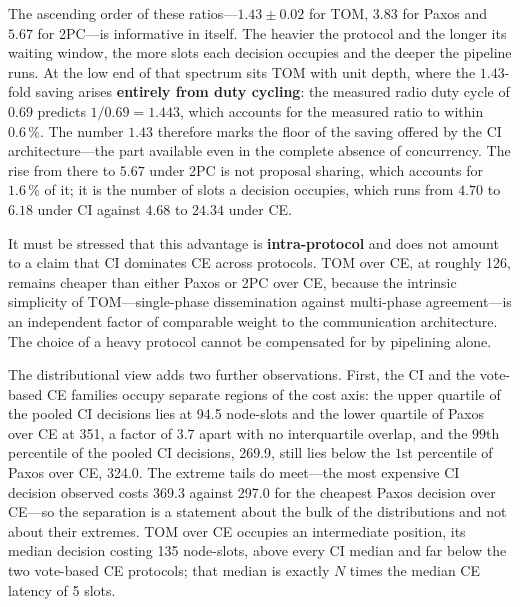 \documentclass[journal]{IEEEtran}
\newcommand{\CI}{CI}                      %
\newcommand{\CE}{CE}                      %
\newcommand{\Nnodes}{N}                   %
\begin{document}
The ascending order of these ratios---$1.43 \pm 0.02$ for TOM, $3.83$ for
Paxos and $5.67$ for 2PC---is informative in itself. The heavier the protocol
and the longer its waiting window, the more slots each decision occupies and
the deeper the pipeline runs. At the low end of that spectrum sits TOM with
unit depth, where the $1.43$-fold saving arises \textbf{entirely from duty
cycling}: the measured radio duty cycle of $0.69$ predicts $1/0.69 = 1.443$,
which accounts for the measured ratio to within $0.6\,\%$. The number $1.43$
therefore marks the floor of the saving offered by the \CI{} architecture---the
part available even in the complete absence of concurrency. The rise from there
to $5.67$ under 2PC is not proposal sharing, which accounts for $1.6\,\%$ of
it; it is the number of slots a decision occupies, which runs from $4.70$ to
$6.18$ under \CI{} against $4.68$ to $24.34$ under \CE.

It must be stressed that this advantage is \textbf{intra-protocol} and
does not amount to a claim that \CI{} dominates \CE{} across protocols.
TOM over \CE, at roughly 126, remains cheaper than either Paxos or 2PC
over \CE, because the intrinsic simplicity of TOM---single-phase
dissemination against multi-phase agreement---is an independent factor of
comparable weight to the communication architecture. The choice of a heavy
protocol cannot be compensated for by pipelining alone.


The distributional view adds two further observations. First, the \CI{} and
the vote-based \CE{} families occupy separate regions of the cost axis: the
upper quartile of the pooled \CI{} decisions lies at 94.5 node-slots and the
lower quartile of Paxos over \CE{} at 351, a factor of $3.7$ apart with no
interquartile overlap, and the $99$th percentile of the pooled \CI{}
decisions, 269.9, still lies below the $1$st percentile of Paxos over \CE,
324.0. The extreme tails do meet---the most expensive \CI{} decision observed
costs 369.3 against 297.0 for the cheapest Paxos decision over \CE---so the
separation is a statement about the bulk of the distributions and not about
their extremes. TOM over \CE{} occupies an intermediate position, its median
decision costing 135 node-slots, above every \CI{} median and far below the
two vote-based \CE{} protocols; that median is exactly $\Nnodes$ times the
median \CE{} latency of 5 slots.
\end{document}
